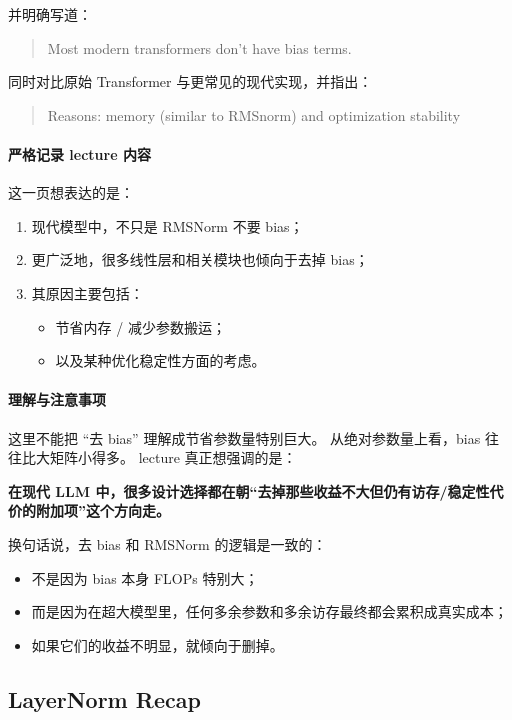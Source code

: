 \documentclass[a4paper,UTF8]{article}
\numberwithin{equation}{section}
\begin{document}
并明确写道：
\begin{quote}
Most modern transformers don’t have bias terms.
\end{quote}

同时对比原始 Transformer 与更常见的现代实现，并指出：
\begin{quote}
Reasons: memory (similar to RMSnorm) and optimization stability
\end{quote}

\paragraph{严格记录 lecture 内容}
这一页想表达的是：

\begin{enumerate}
    \item 现代模型中，不只是 RMSNorm 不要 bias；
    \item 更广泛地，很多线性层和相关模块也倾向于去掉 bias；
    \item 其原因主要包括：
    \begin{itemize}
        \item 节省内存 / 减少参数搬运；
        \item 以及某种优化稳定性方面的考虑。
    \end{itemize}
\end{enumerate}

\paragraph{理解与注意事项}
这里不能把 ``去 bias'' 理解成节省参数量特别巨大。  
从绝对参数量上看，bias 往往比大矩阵小得多。  
lecture 真正想强调的是：

\begin{center}
\textbf{在现代 LLM 中，很多设计选择都在朝“去掉那些收益不大但仍有访存/稳定性代价的附加项”这个方向走。}
\end{center}

换句话说，去 bias 和 RMSNorm 的逻辑是一致的：
\begin{itemize}
    \item 不是因为 bias 本身 FLOPs 特别大；
    \item 而是因为在超大模型里，任何多余参数和多余访存最终都会累积成真实成本；
    \item 如果它们的收益不明显，就倾向于删掉。
\end{itemize}

\subsection{LayerNorm Recap}
\end{document}
